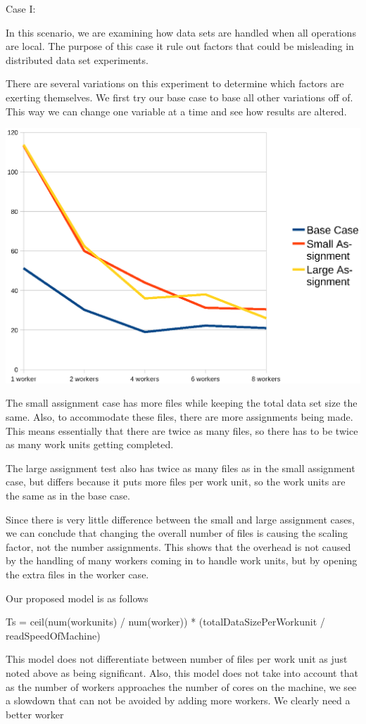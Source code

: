 \documentclass[a4paper,11pt]{article}
\begin{document}
Case I:

In this scenario, we are examining how data sets are handled
when all operations are local.  The purpose of this case it
rule out factors that could be misleading in distributed
data set experiments.  

There are several variations on this experiment to determine
which factors are exerting themselves.  We first try our
base case to base all other variations off of.  This way we
can change one variable at a time and see how results are
altered.

\includegraphics{figure1.eps}

The small assignment case has more files while keeping the
total data set size the same.  Also, to accommodate these
files, there are more assignments being made.  This means
essentially that there are twice as many files, so there has
to be twice as many work units getting completed.

The large assignment test also has twice as many files as in
the small assignment case, but differs because it puts more
files per work unit, so the work units are the same as in
the base case.

Since there is very little difference between the small and
large assignment cases, we can conclude that changing the
overall number of files is causing the scaling factor, not
the number assignments.  This shows that the overhead is not
caused by the handling of many workers coming in to handle
work units, but by opening the extra files in the worker
case.

Our proposed model is as follows

Ts = ceil(num(workunits) / num(worker)) * (totalDataSizePerWorkunit / readSpeedOfMachine)

This model does not differentiate between number of files
per work unit as just noted above as being significant.
Also, this model does not take into account that as the
number of workers approaches the number of cores on the
machine, we see a slowdown that can not be avoided by adding
more workers. We clearly need a better worker
\end{document}
